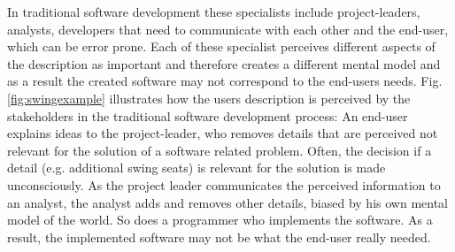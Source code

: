 \documentclass[runningheads,a4paper]{llncs}
\begin{document}
In traditional software development these specialists include project-leaders, analysts, developers that need 
to communicate with each other and the end-user, which can be error prone.
Each of these specialist perceives different aspects of the description as important and therefore creates a different mental model
and as a result the created software may not correspond to the end-users needs. 
Fig. \ref{fig:swingexample} illustrates how the users description is perceived by the stakeholders in the traditional software development process:
An end-user explains ideas to the project-leader, who removes details that are perceived not relevant for the solution of a software related problem.
Often, the decision if a detail (e.g. additional swing seats) is relevant for the solution is made unconsciously. 
As the project leader communicates the perceived information to an analyst, the analyst adds and removes other details, biased by his own mental model of the world. 
So does a programmer who implements the software. As a result, the implemented software may not be what the end-user really needed.
\end{document}
